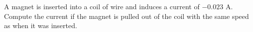 A magnet is inserted into a coil of wire and induces a current of $-0.023$ A. 
Compute the current if the magnet is pulled out of the coil with the same speed as when it was inserted. %